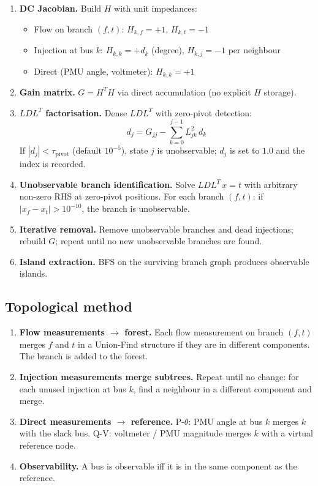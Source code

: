 \documentclass[11pt,a4paper]{article}
\begin{document}
\begin{enumerate}
  \item \textbf{DC Jacobian.}  Build $H$ with unit impedances:
    \begin{itemize}
      \item Flow on branch $(f,t)$: $H_{k,f} = +1$, $H_{k,t} = -1$
      \item Injection at bus $k$: $H_{k,k} = +d_k$ (degree),
            $H_{k,j} = -1$ per neighbour
      \item Direct (PMU angle, voltmeter): $H_{k,k} = +1$
    \end{itemize}
  \item \textbf{Gain matrix.} $G = H^TH$ via direct accumulation (no
        explicit $H$ storage).
  \item \textbf{$LDL^T$ factorisation.} Dense $LDL^T$ with zero-pivot
        detection:
    \begin{equation}
      d_j = G_{jj} - \sum_{k=0}^{j-1} L_{jk}^2\,d_k
    \end{equation}
    If $|d_j| < \tau_\text{pivot}$ (default $10^{-5}$), state $j$ is
    unobservable; $d_j$ is set to $1.0$ and the index is recorded.
  \item \textbf{Unobservable branch identification.}  Solve $LDL^T\,x = t$
        with arbitrary non-zero RHS at zero-pivot positions.  For each
        branch $(f,t)$: if $|x_f - x_t| > 10^{-10}$, the branch is
        unobservable.
  \item \textbf{Iterative removal.}  Remove unobservable branches and
        dead injections; rebuild $G$; repeat until no new unobservable
        branches are found.
  \item \textbf{Island extraction.}  BFS on the surviving branch graph
        produces observable islands.
\end{enumerate}

\subsection{Topological method}\label{sec:obs-topo}

\begin{enumerate}
  \item \textbf{Flow measurements $\to$ forest.}  Each flow measurement
        on branch $(f,t)$ merges $f$ and $t$ in a Union-Find structure if
        they are in different components.  The branch is added to the
        forest.
  \item \textbf{Injection measurements merge subtrees.}  Repeat until no
        change: for each unused injection at bus $k$, find a neighbour in
        a different component and merge.
  \item \textbf{Direct measurements $\to$ reference.}  P-$\theta$: PMU
        angle at bus $k$ merges $k$ with the slack bus.  Q-V: voltmeter /
        PMU magnitude merges $k$ with a virtual reference node.
  \item \textbf{Observability.}  A bus is observable iff it is in the same
        component as the reference.
\end{enumerate}
\end{document}

